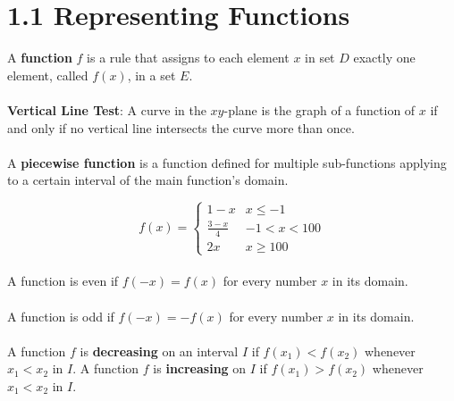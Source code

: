 %
%

\section*{1.1 Representing Functions}

A \textbf{function} \(f\) is a rule that assigns to each element \(x\) in set \(D\) exactly one element, called \(f(x)\), in a set \(E\).
\\\\
\textbf{Vertical Line Test}: A curve in the \(xy\)-plane is the graph of a function of \(x\) if and only if no vertical line intersects the curve more than once.
\\\\
A \textbf{piecewise function} is a function defined for multiple sub-functions applying to a certain interval of the main function's domain.

\[ f(x)=
    \begin{cases} 
      1-x & x\leq -1 \\
      \frac{3-x}{4} & -1 < x < 100 \\
      2x & x\geq 100
   \end{cases}
\]
\\
A function is even if \(f(-x)=f(x)\) for every number \(x\) in its domain.
\\\\
A function is odd if \(f(-x)=-f(x)\) for every number \(x\) in its domain.
\\\\
A function \(f\) is \textbf{decreasing} on an interval \(I\) if \(f(x_1)<f(x_2)\) whenever \(x_1 < x_2\) in \(I\).
A function \(f\) is \textbf{increasing} on \(I\) if \(f(x_1)>f(x_2)\) whenever \(x_1<x_2\) in \(I\).
